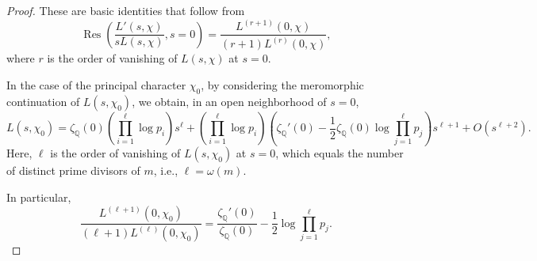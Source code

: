 \documentclass[12pt]{amsart}
\begin{document}
\begin{proof}
These are basic identities that follow from
\[
\operatorname{Res}\left( \frac{L'(s,\chi)}{s L(s,\chi)}, s=0 \right) = \frac{L^{(r+1)}(0,\chi)}{(r+1) L^{(r)}(0,\chi)},
\]
where $r$ is the order of vanishing of $L(s,\chi)$ at $s=0$.


In the case of the principal character $\chi_0$, by considering the meromorphic continuation of $L(s,\chi_0)$, we obtain, in an open neighborhood of $s=0$,
\begin{equation}\label{ls0}
L(s,\chi_0) = \zeta_\mathbb{Q}(0) \left( \prod_{i=1}^{\ell} \log p_i \right) s^\ell + \left( \prod_{i=1}^{\ell} \log p_i \right) \left( \zeta_\mathbb{Q}'(0) - \frac{1}{2} \zeta_\mathbb{Q}(0) \log \prod_{j=1}^{\ell} p_j \right) s^{\ell+1} + O(s^{\ell+2}).
\end{equation}
Here, $\ell$ is the order of vanishing of $L(s,\chi_0)$ at $s=0$, which equals the number of distinct prime divisors of $m$, i.e., $\ell = \omega(m)$.


In particular,
\begin{equation}\label{8}
\frac{L^{(\ell+1)}(0,\chi_0)}{(\ell+1) L^{(\ell)}(0,\chi_0)} = \frac{\zeta_\mathbb{Q}'(0)}{\zeta_\mathbb{Q}(0)} - \frac{1}{2} \log \prod_{j=1}^{\ell} p_j.
\end{equation}
\end{proof}
\end{document}
